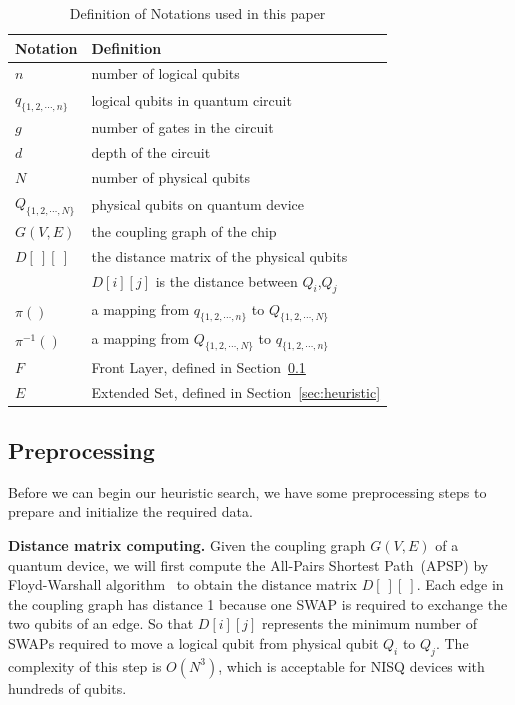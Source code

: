 \documentclass[journal,10pt,twocolumn]{IEEEtran}
\begin{document}
\begin{table}[h!]
  \centering
  \caption{Definition of Notations used in this paper}
 \vspace{3pt}
  \begin{tabular}{|l|l|}
    \hline
    \textbf{Notation} & \textbf{Definition}\\
    \hline
    $n$ & number of logical qubits \\
    \hline
    $q_{\{1,2,\cdots,n\}}$ & logical qubits in quantum circuit \\
    \hline
    $g$ & number of gates in the circuit\\
    \hline
    $d$ & depth of the circuit\\
    \hline
    $N$ & number of physical qubits \\
    \hline
    $Q_{\{1,2,\cdots,N\}}$ & physical qubits on quantum device \\
    \hline
    $G(V,E)$ & the coupling graph of the chip\\
    \hline
    $D[~][~]$ &  the distance matrix of the physical qubits\\
            & $D[i][j]$ is the distance between $Q_i$,$Q_j$\\
    \hline
    $\pi()$ & a mapping from $q_{\{1,2,\cdots,n\}}$ to $Q_{\{1,2,\cdots,N\}}$ \\
    \hline
    $\pi^{-1}()$ & a mapping from $Q_{\{1,2,\cdots,N\}}$ to $q_{\{1,2,\cdots,n\}}$ \\
    \hline
    $F$ & Front Layer, defined in Section~\ref{sec:preprocessing} \\
    \hline
    $E$ & Extended Set, defined in Section~\ref{sec:heuristic} \\
    \hline
  \end{tabular}
  \label{tab:notation}
\end{table}


\subsection{Preprocessing}\label{sec:preprocessing}

Before we can begin our heuristic search, we have some preprocessing steps to prepare and initialize the required data.

\textbf{Distance matrix computing.} 
Given the coupling graph $G(V,E)$ of a quantum device, we will first compute the All-Pairs Shortest Path~(APSP) by Floyd-Warshall algorithm~\cite{floyd1962algorithm} to obtain the distance matrix $D[~][~]$.
Each edge in the coupling graph has distance 1 because one SWAP is required to exchange the two qubits of an edge. So that $D[i][j]$ represents the minimum number of SWAPs required to move a logical qubit from physical qubit $Q_i$ to $Q_j$.
The complexity of this step is $O(N^3)$, which is acceptable for NISQ devices with hundreds of qubits.
\end{document}
